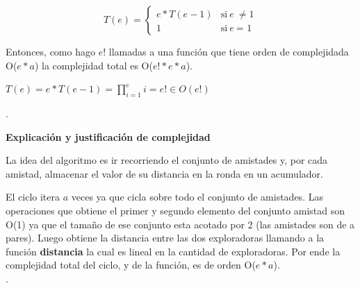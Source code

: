 \documentclass[11pt]{article}
\begin{document}
\vspace{1mm}

\[ T(e) = 
  \begin{cases} 
    e * T(e-1) & \mbox{si} \ e \ \neq \mbox{1} \\
    1 & \mbox{si} \ e \ \mbox{= 1} 
  \end{cases}
\]

\vspace{2mm}

Entonces, como hago $e!$  llamadas a una función que tiene orden de complejidada O($e*a$) la complejidad 
total es O($e!*e*a$).

\begin{center}
$T(e) = e * T(e-1) = \prod_{i=1}^{e} i = e! \in O(e!)$
\end{center}

\vspace{5mm}
\noindent\makebox[\linewidth]{\rule{17cm}{0.4pt}}

.
\\

\vspace{3mm}
\begin{center}
\textbf{Explicación y justificación de complejidad} \\ 
\end{center} 
La idea del algoritmo es ir recorriendo el conjunto de amistades y, por cada amistad, almacenar el valor de 
su distancia en la ronda en un acumulador.

El ciclo itera $a$ veces ya que cicla sobre todo el conjunto de amistades. Las operaciones que obtiene el 
primer y segundo elemento del conjunto amistad son O(1) ya que el tamaño de ese conjunto esta acotado por 
2 (las amistades son de a pares). Luego obtiene la distancia entre las dos exploradoras llamando a la 
función \textbf{distancia} la cual es lineal en la cantidad de exploradoras. Por ende la complejidad
total del ciclo, y de la función, es de orden O($e*a$). \\
\noindent\makebox[\linewidth]{\rule{17cm}{0.4pt}}
.
\\
\end{document}

